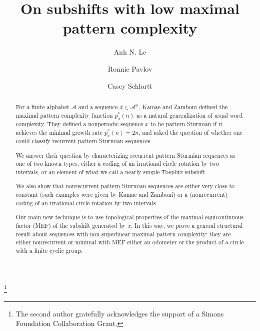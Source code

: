\documentclass[11pt,reqno]{amsart}
\theoremstyle{definition}
\theoremstyle{plain}
\newcommand{\A}{\mathcal{A}}
\begin{document}
\title[On subshifts with low maximal pattern complexity]{On subshifts with low maximal pattern complexity}

\author{Anh N. Le}
\address{Anh N. Le\\
Department of Mathematics\\
University of Denver\\
2390 S. York St.\\
Denver, CO 80208}

\author{Ronnie Pavlov}
\address{Ronnie Pavlov\\
Department of Mathematics\\
University of Denver\\
2390 S. York St.\\
Denver, CO 80208}

\author{Casey Schlortt}
\address{Casey Schlortt\\
Department of Mathematics\\
University of Denver\\
2390 S. York St.\\
Denver, CO 80208}

\thanks{The second author gratefully acknowledges the support of a Simons Foundation Collaboration Grant.}

\renewcommand{\subjclassname}{MSC 2020}

\begin{abstract}
For a finite alphabet $\mathcal{A}$ and a sequence $x \in \A^{\mathbb{N}}$, Kamae and Zamboni defined the maximal pattern complexity function $p^*_x(n)$ as a natural generalization of usual word complexity. They defined a nonperiodic sequence $x$ to be pattern Sturmian if it achieves the minimal growth rate $p^*_x(n) = 2n$, and asked the question of whether one could classify recurrent pattern Sturmian sequences. 

We answer their question by characterizing recurrent pattern Sturmian sequences as one of two known types: either a coding of an irrational circle rotation by two intervals, or an element of what we call a nearly simple Toeplitz subshift.


We also show that nonrecurrent pattern Sturmian sequences are either very close to constant (such examples were given by Kamae and Zamboni) or a (nonrecurrent) coding of an irrational circle rotation by two intervals.

Our main new technique is to use topological properties of the maximal equicontinuous factor (MEF) of the subshift generated by $x$. In this way, we prove a general structural result about sequences with non-superlinear maximal pattern complexity: they are either nonrecurrent or minimal with MEF either an odometer or the product of a circle with a finite cyclic group.

\end{abstract}
\end{document}
